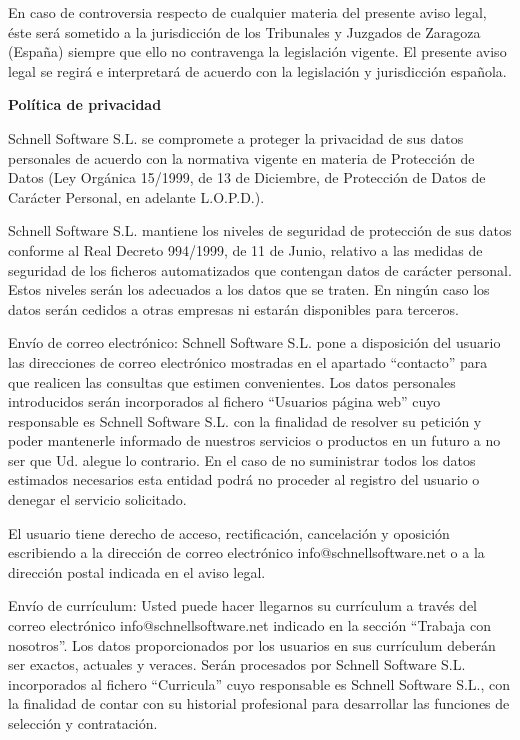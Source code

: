 \documentclass[10pt,a4paper]{article}
\begin{document}
\begin{enumerate}
En caso de controversia respecto de cualquier materia del presente aviso legal, éste será sometido a la jurisdicción de los Tribunales y Juzgados de Zaragoza (España) siempre que ello no contravenga la legislación vigente. El presente aviso legal se regirá e interpretará de acuerdo con la legislación y jurisdicción española.

\textbf{Política de privacidad}

Schnell Software S.L. se compromete a proteger la privacidad de sus datos personales de acuerdo con la normativa vigente en materia de Protección de Datos (Ley Orgánica 15/1999, de 13 de Diciembre, de Protección de Datos de Carácter Personal, en adelante L.O.P.D.).

Schnell Software S.L. mantiene los niveles de seguridad de protección de sus datos conforme al Real Decreto 994/1999, de 11 de Junio, relativo a las medidas de seguridad de los ficheros automatizados que contengan datos de carácter personal. Estos niveles serán los adecuados a los datos que se traten. En ningún caso los datos serán cedidos a otras empresas ni estarán disponibles para terceros.

Envío de correo electrónico: Schnell Software S.L. pone a disposición del usuario las direcciones de correo electrónico mostradas en el apartado “contacto” para que realicen las consultas que estimen convenientes. Los datos personales introducidos serán incorporados al fichero “Usuarios página web” cuyo responsable es Schnell Software S.L. con la finalidad de resolver su petición y poder mantenerle informado de nuestros servicios o productos en un futuro a no ser que Ud. alegue lo contrario. En el caso de no suministrar todos los datos estimados necesarios esta entidad podrá no proceder al registro del usuario o denegar el servicio solicitado.

El usuario tiene derecho de acceso, rectificación, cancelación y oposición escribiendo a la dirección de correo electrónico info@schnellsoftware.net o a la dirección postal indicada en el aviso legal.

Envío de currículum: Usted puede hacer llegarnos su currículum a través del correo electrónico info@schnellsoftware.net indicado en la sección “Trabaja con nosotros”. Los datos proporcionados por los usuarios  en sus currículum deberán ser exactos, actuales y veraces. Serán procesados por Schnell Software S.L.  incorporados al fichero “Curricula” cuyo responsable es Schnell Software S.L., con la finalidad de contar con su historial profesional para desarrollar las funciones de selección y contratación.


\end{enumerate}
\end{document}
